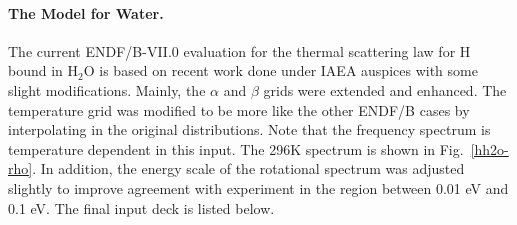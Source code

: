 \paragraph{The Model for Water.}
The current ENDF/B-VII.0 evaluation for the thermal scattering law for
H bound in H$_2$O is based on recent work done under IAEA
auspices\cite{mattes} with some slight modifications.
Mainly, the $\alpha$ and $\beta$ grids were extended and enhanced.  The
temperature grid was modified to be more like the other ENDF/B cases
by interpolating in the original distributions.  Note that the
frequency spectrum is temperature dependent in this input.  The 296K
spectrum is shown in Fig.~\ref{hh2o-rho}.  In
addition, the energy scale of the rotational spectrum was adjusted
slightly to improve agreement with experiment in the region
between 0.01 eV and 0.1 eV.  The final input deck is listed below.

